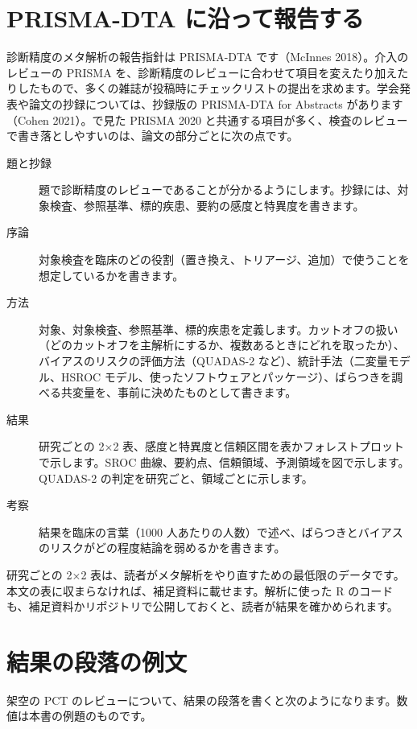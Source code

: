\section{PRISMA-DTA に沿って報告する}
\label{sec:15-3}

診断精度のメタ解析の報告指針は PRISMA-DTA です（McInnes 2018）。介入のレビューの PRISMA を、診断精度のレビューに合わせて項目を変えたり加えたりしたもので、多くの雑誌が投稿時にチェックリストの提出を求めます。学会発表や論文の抄録については、抄録版の PRISMA-DTA for Abstracts があります（Cohen 2021）。で見た PRISMA 2020 と共通する項目が多く、検査のレビューで書き落としやすいのは、論文の部分ごとに次の点です。

\begin{description}
\item[題と抄録] 題で診断精度のレビューであることが分かるようにします。抄録には、対象検査、参照基準、標的疾患、要約の感度と特異度を書きます。
\item[序論] 対象検査を臨床のどの役割（置き換え、トリアージ、追加）で使うことを想定しているかを書きます。
\item[方法] 対象、対象検査、参照基準、標的疾患を定義します。カットオフの扱い（どのカットオフを主解析にするか、複数あるときにどれを取ったか）、バイアスのリスクの評価方法（QUADAS-2 など）、統計手法（二変量モデル、HSROC モデル、使ったソフトウェアとパッケージ）、ばらつきを調べる共変量を、事前に決めたものとして書きます。
\item[結果] 研究ごとの 2×2 表、感度と特異度と信頼区間を表かフォレストプロットで示します。SROC 曲線、要約点、信頼領域、予測領域を図で示します。QUADAS-2 の判定を研究ごと、領域ごとに示します。
\item[考察] 結果を臨床の言葉（1000 人あたりの人数）で述べ、ばらつきとバイアスのリスクがどの程度結論を弱めるかを書きます。
\end{description}

研究ごとの 2×2 表は、読者がメタ解析をやり直すための最低限のデータです。本文の表に収まらなければ、補足資料に載せます。解析に使った R のコードも、補足資料かリポジトリで公開しておくと、読者が結果を確かめられます。

\section{結果の段落の例文}
\label{sec:15-4}

架空の PCT のレビューについて、結果の段落を書くと次のようになります。数値は本書の例題のものです。

